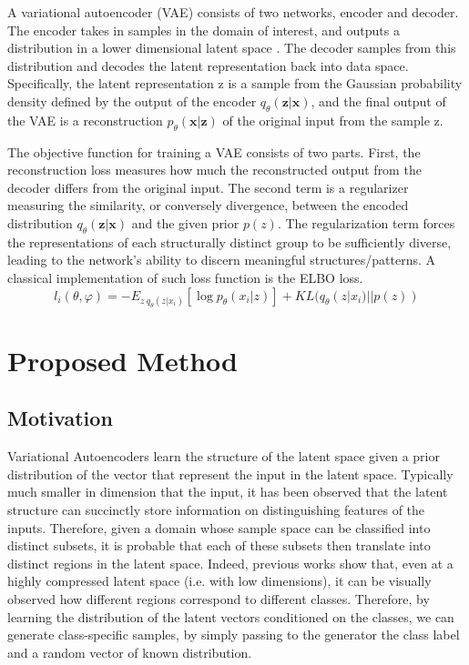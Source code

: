 \documentclass{article}
\begin{document}
A variational autoencoder (VAE) consists of two networks, encoder and decoder. The encoder
takes in samples in the domain of interest, and outputs a distribution in a lower dimensional
latent space \cite{Kingma2}. The decoder samples from this distribution and decodes the latent representation
back into data space. Specifically, the latent representation z is a sample from the Gaussian
probability density defined by the output of the encoder $q_\theta(\mathbf{z}|\mathbf{x})$, and
the final output of the VAE is a reconstruction $p_\theta(\mathbf{x}|\mathbf{z})$ of the original input 
from the sample z. \par
The objective function for training a VAE consists of two parts. First, the reconstruction loss measures how much the reconstructed output from the decoder differs from the original input. The second term is a regularizer measuring the similarity, or conversely divergence, between the encoded distribution $q_\theta(\mathbf{z}|\mathbf{x})$ and the given prior $p(z)$. The regularization term forces the representations of each structurally distinct group to be sufficiently diverse, leading to the network's ability to discern meaningful structures/patterns. A classical implementation of such loss function is the ELBO loss.
\begin{equation} 
l_i(\theta, \varphi) = - E_{z~q_\theta(z|x_i)} [\log{p_\theta(x_i|z)}]+KL(q_\theta(z|x_i)||p(z))
\end{equation}

\section{Proposed Method}
\label{sec:proposal}
\subsection{Motivation}

Variational Autoencoders learn the structure of the latent space given a prior distribution of the vector that represent the input in the latent space. Typically much smaller in dimension that the input, it has been observed that the latent structure can succinctly store information on distinguishing features of the inputs. Therefore, given a domain whose sample space can be classified into distinct subsets, it is probable that each of these subsets then translate into distinct regions in the latent space. Indeed, previous works \cite{Kingma,Ranzato,Roberts,Yan,zhao2017infovae} show that, even at a highly compressed latent space (i.e. with low dimensions), it can be visually observed how different regions correspond to different classes.
Therefore, by learning the distribution of the latent vectors conditioned on the classes, we can generate class-specific samples, by simply passing to the generator the class label and a random vector of known distribution.
\end{document}
